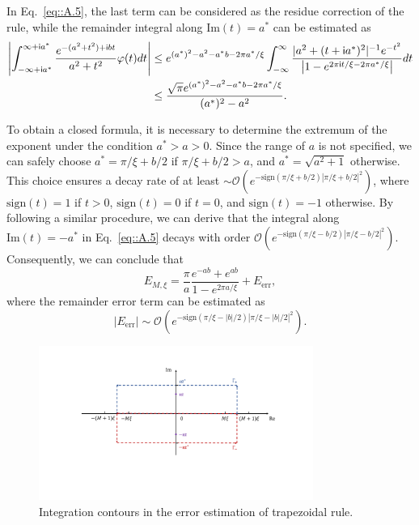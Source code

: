 In Eq.~\eqref{eq::A.5}, the last term can be considered as the residue correction of the rule, while the remainder integral along $\text{Im}(t)=a^*$ can be estimated as
\begin{equation}
\begin{split}
\left|\int_{-\infty+\mathsf i a^*}^{\infty+\mathsf i a^*}\frac{e^{-(a^2+t^2)+\mathsf i b t}}{a^2+t^2}\varphi(t)dt\right|&\leq e^{(a^*)^2-a^2-a^*b-2\pi a^*/\xi}\int_{-\infty}^{\infty}\frac{|a^2+(t+\mathsf i a^*)^2|^{-1}e^{-t^2}}{\left|1-e^{2\pi\mathsf i t/\xi-2\pi a^*/\xi}\right|}dt\\
&\leq\frac{\sqrt{\pi}e^{(a^*)^2-a^2-a^*b-2\pi a^*/\xi}}{(a^*)^2-a^2}.
\end{split}
\end{equation}

To obtain a closed formula, it is necessary to determine the extremum of the exponent under the condition $a^*>a>0$. Since the range of $a$ is not specified, we can safely choose $a^*=\pi/\xi+b/2$ if $\pi/\xi+b/2>a$, and $a^*=\sqrt{a^2+1}$ otherwise. This choice ensures a decay rate of at least $\sim\mathcal{O}(e^{-\text{sign}(\pi/\xi+b/2)|\pi/\xi+b/2|^2})$, where $\text{sign}(t)=1$ if $t> 0$, $\text{sign}(t)=0$ if $t=0$, and $\text{sign}(t)=-1$ otherwise. By following a similar procedure, we can derive that the integral along $\text{Im}(t)=-a^*$ in Eq.~\eqref{eq::A.5} decays with order $\mathcal{O}(e^{-\text{sign}(\pi/\xi-b/2)|\pi/\xi-b/2|^2})$. Consequently, we can conclude that
\begin{equation}
E_{M,\xi}=\frac{\pi}{a}\frac{e^{-ab}+e^{ab}}{1-e^{2\pi a/\xi}}+E_{\text{err}},
\end{equation}
where the remainder error term can be estimated as 
\begin{equation}\label{eq::A.8}
|E_{\text{err}}|\sim \mathcal{O}(e^{-\text{sign}(\pi/\xi-|b|/2)\left|\pi/\xi-|b|/2\right|^2}).
\end{equation}

\begin{figure}[!ht]
    \begin{center}
    \includegraphics[width=0.8\textwidth]{figs/Trapezoidal.pdf}
    \caption{Integration contours in the error estimation of trapezoidal rule.}
    \label{fig:Trapezoidal}
    \end{center} 
\end{figure}

